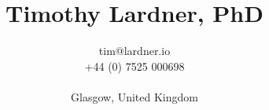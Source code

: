\documentclass[12pt]{article}
\title{\bfseries\Huge Timothy Lardner, PhD}
\author{tim@lardner.io\\+44 (0) 7525 000698\\ \\ Glasgow, United Kingdom}
\date{}
\let\stdsection\section
\begin{document}
\maketitle

\renewcommand\section{\newpage\stdsection}


%

\end{document}
